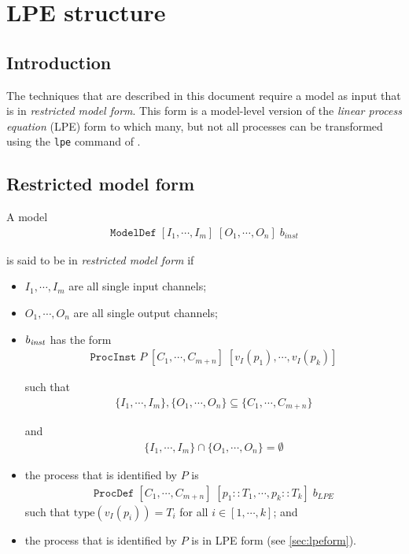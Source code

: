 \chapter{LPE structure}

\section{Introduction}
The techniques that are described in this document require a \txs{} model as input that is in \emph{restricted model form}.
This form is a model-level version of the \emph{linear process equation} (LPE) form to which many, but not all \txs{} processes can be transformed using the \texttt{lpe} command of \txs{}.

\section{Restricted model form} \label{sec:restrictedmodelform}

A \txs{} model
\begin{align*}
\texttt{ModelDef} \; [I_1, \cdots{}, I_m] \; [O_1, \cdots{}, O_n] \; b_\textit{inst}
\end{align*}

is said to be in \emph{restricted model form} if

\begin{itemize}
\item $I_1, \cdots{}, I_m$ are all single input channels;
\item $O_1, \cdots{}, O_n$ are all single output channels;
\item $b_\text{\textit{inst}}$ has the form
\begin{align*}
\texttt{ProcInst} \; P \; [C_1, \cdots{}, C_{m+n}] \; [v_I(p_1), \cdots{}, v_I(p_k)]
\end{align*}

such that
\begin{align*}
\{ I_1, \cdots{}, I_m \}, \{ O_1, \cdots{}, O_n \} \subseteq \{ C_1, \cdots{}, C_{m+n} \}
\end{align*}

and
\begin{align*}
\{ I_1, \cdots{}, I_m \} \cap \{ O_1, \cdots{}, O_n \} = \emptyset{}
\end{align*}

\item the \txs{} process that is identified by $P$ is
\begin{align*}
\texttt{ProcDef} \; [C_1, \cdots{}, C_{m+n}] \; [p_1 :: T_1, \cdots{}, p_k :: T_k] \; b_\textit{LPE}
\end{align*}
such that $\text{type}(v_I(p_i)) = T_i$ for all $i \in [1, \cdots{}, k]$; and
\item the \txs{} process that is identified by $P$ is in LPE form (see \ref{sec:lpeform}).
\end{itemize}

